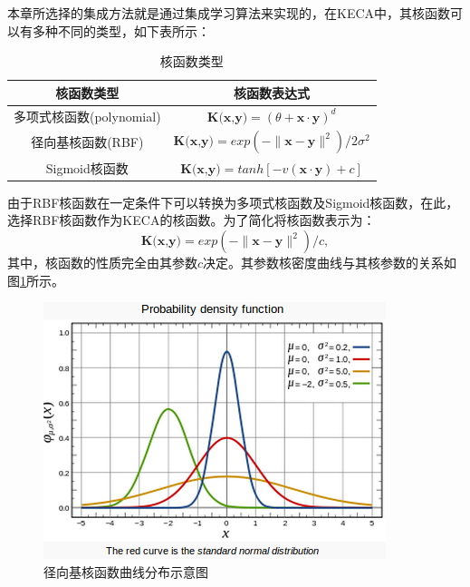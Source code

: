 本章所选择的集成方法就是通过集成学习算法来实现的，在KECA中，其核函数可以有多种不同的类型，如下表所示：
\begin{table}[htb]
\caption{核函数类型}
\label{kernelfunction}
\centering
\begin{tabular}[t]{c|c}
\hline
核函数类型& 核函数表达式\\
\hline
多项式核函数(polynomial) & $\textbf{K(x,y)}=(\theta+\textbf{x}\cdot \textbf{y})^d$\\
径向基核函数(RBF) &  $\textbf{K(x,y)}=exp(-\parallel \textbf{x}-\textbf{y}\parallel^2)/2\sigma^2$\\
Sigmoid核函数 & $\textbf{K(x,y)}=tanh[-v(\textbf{x}\cdot \textbf{y})+c]$\\
\hline
\end{tabular}
\end{table}
由于RBF核函数在一定条件下可以转换为多项式核函数及Sigmoid核函数，在此，选择RBF核函数作为KECA的核函数。为了简化将核函数表示为：
\begin{equation}
\textbf{K(x,y)}=exp(-\parallel \textbf{x}-\textbf{y}\parallel^2)/c,
\end{equation}
其中，核函数的性质完全由其参数$c$决定。其参数核密度曲线与其核参数的关系如图\ref{rbf}所示。
\begin{figure}[htb]
\centering
\includegraphics[scale=0.6]{./Pictures/rbf.jpg}
\caption{径向基核函数曲线分布示意图}
\label{rbf}
\end{figure}


